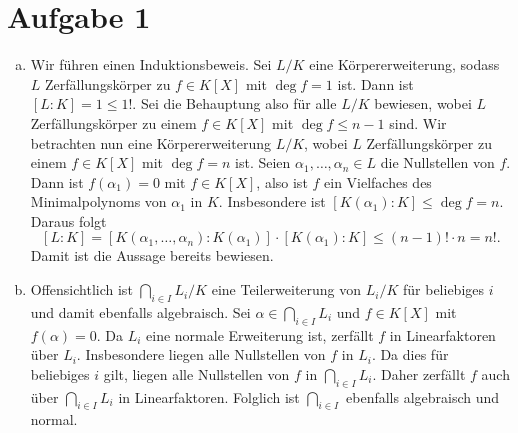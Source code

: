 \documentclass{article}
\begin{document}
\def\headheight{25pt}
    \section*{Aufgabe 1}
    \begin{enumerate}[(a)]
        \item Wir führen einen Induktionsbeweis. 
        Sei $L/K$ eine Körpererweiterung, sodass $L$ Zerfällungskörper zu $f\in K[X]$ mit $\deg f = 1$ ist.
        Dann ist $[L\colon K] = 1 \leq 1!$.
        Sei die Behauptung also für alle $L/K$ bewiesen, wobei $L$ Zerfällungskörper zu einem $f\in K[X]$ mit $\deg f \leq n-1$ sind.
        Wir betrachten nun eine Körpererweiterung $L/K$, wobei $L$ Zerfällungskörper zu einem $f\in K[X]$ mit $\deg f = n$ ist.
        Seien $\alpha_1,\dots,\alpha_n \in L$ die Nullstellen von $f$.
        Dann ist $f(\alpha_1) = 0$ mit $f \in K[X]$, also ist $f$ ein Vielfaches des Minimalpolynoms von $\alpha_1$ in $K$.
        Insbesondere ist $[K(\alpha_1) \colon K] \leq \deg f = n$. Daraus folgt
        \[
            [L\colon K] = [K(\alpha_1, \dots, \alpha_n)\colon K(\alpha_1)] \cdot [K(\alpha_1) \colon K] \leq (n-1)! \cdot n = n!.
        \]
        Damit ist die Aussage bereits bewiesen.
        \item Offensichtlich ist $\bigcap_{i\in I} L_i / K$ eine Teilerweiterung von $L_i/K$ für beliebiges $i$ und damit ebenfalls algebraisch.
        Sei $\alpha \in \bigcap_{i\in I} L_i$ und $f \in K[X]$ mit $f(\alpha) = 0$. 
        Da $L_i$ eine normale Erweiterung ist, zerfällt $f$ in Linearfaktoren über $L_i$. 
        Insbesondere liegen alle Nullstellen von $f$ in $L_i$.
        Da dies für beliebiges $i$ gilt, liegen alle Nullstellen von $f$ in $\bigcap_{i\in I} L_i$. 
        Daher zerfällt $f$ auch über $\bigcap_{i\in I} L_i$ in Linearfaktoren.
        Folglich ist $\bigcap_{i\in I}$ ebenfalls algebraisch und normal.
    \end{enumerate}
\end{document}
